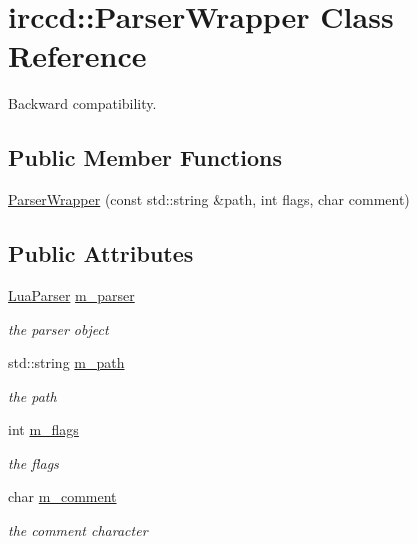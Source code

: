 \hypertarget{a00049}{\section{irccd\-:\-:Parser\-Wrapper Class Reference}
\label{a00049}
}


Backward compatibility.  


\subsection*{Public Member Functions}
\begin{DoxyCompactItemize}
\item 
\hyperlink{a00049_a3d7a27594b4b190d75cc946142a16333}{Parser\-Wrapper} (const std\-::string \&path, int flags, char comment)
\end{DoxyCompactItemize}
\subsection*{Public Attributes}
\begin{DoxyCompactItemize}
\item 
\hypertarget{a00049_a0bd7eca485096593cf1318cbdaa7ad54}{\hyperlink{a00046}{Lua\-Parser} \hyperlink{a00049_a0bd7eca485096593cf1318cbdaa7ad54}{m\-\_\-parser}}\label{a00049_a0bd7eca485096593cf1318cbdaa7ad54}

\begin{DoxyCompactList}\small\item\em the parser object \end{DoxyCompactList}\item 
\hypertarget{a00049_a75c74e23c9ea4404dfc97187f9a6047c}{std\-::string \hyperlink{a00049_a75c74e23c9ea4404dfc97187f9a6047c}{m\-\_\-path}}\label{a00049_a75c74e23c9ea4404dfc97187f9a6047c}

\begin{DoxyCompactList}\small\item\em the path \end{DoxyCompactList}\item 
\hypertarget{a00049_ab1553aa8f33ab181b1d0a5e467d48ad3}{int \hyperlink{a00049_ab1553aa8f33ab181b1d0a5e467d48ad3}{m\-\_\-flags}}\label{a00049_ab1553aa8f33ab181b1d0a5e467d48ad3}

\begin{DoxyCompactList}\small\item\em the flags \end{DoxyCompactList}\item 
\hypertarget{a00049_ac83f9ea5f426fcf0794c670253992a19}{char \hyperlink{a00049_ac83f9ea5f426fcf0794c670253992a19}{m\-\_\-comment}}\label{a00049_ac83f9ea5f426fcf0794c670253992a19}

\begin{DoxyCompactList}\small\item\em the comment character \end{DoxyCompactList}\end{DoxyCompactItemize}


